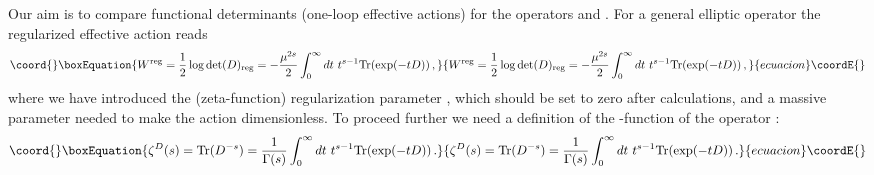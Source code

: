 \documentclass[a4paper,12pt]{article}
\begin{document}
Our aim is to compare functional determinants (one-loop effective actions)
for the operators \myHighlight{$\Delta_+$}\coordHE{} and \myHighlight{$\Delta_-$}\coordHE{}. For a general elliptic
operator
the regularized effective action reads
\begin{equation}\coord{}\boxEquation{
W^{\mbox{\scriptsize reg}}=\frac 12 \log \det (D)_{\mbox{\scriptsize reg}}
= -\frac{\mu^{2s}}{2}
\int_0^\infty dt~t^{s-1}
{\rm Tr} (\exp (-tD)) \,, \label{effact}
}{
W^{\mbox{\scriptsize reg}}=\frac 12 \log \det (D)_{\mbox{\scriptsize reg}}
= -\frac{\mu^{2s}}{2}
\int_0^\infty dt~t^{s-1}
{\rm Tr} (\exp (-tD)) \,, }{ecuacion}\coordE{}\end{equation}
where we have introduced the (zeta-function) regularization
parameter \coordHE{}, which should be set to zero after calculations,
and a massive parameter \myHighlight{$\mu$}\coordHE{} needed to make the action
dimensionless. To proceed further we need a definition of
the \myHighlight{$\zeta$}\coordHE{}-function of the operator \coordHE{}:
\begin{equation}\coord{}\boxEquation{
\zeta^D (s)= {\rm Tr}(D^{-s})=
\frac 1{\Gamma (s)} \int_0^\infty dt~t^{s-1}
{\rm Tr} (\exp (-tD)) \,. \label{defzD}
}{
\zeta^D (s)= {\rm Tr}(D^{-s})=
\frac 1{\Gamma (s)} \int_0^\infty dt~t^{s-1}
{\rm Tr} (\exp (-tD)) \,. }{ecuacion}\coordE{}\end{equation}
\end{document}
